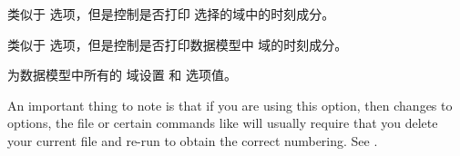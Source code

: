 \begin{optionlist}

类似于  选项，但是控制是否打印  选择的域中的时刻成分。


类似于  选项，但是控制是否打印数据模型中  域的时刻成分。


为数据模型中所有的  域设置  和  选项值。



 An important thing to note is that if you are using this option, then changes to options, the  file or certain commands like  will usually require that you delete your current  file and re-run \latex to obtain the correct numbering. See .


\end{optionlist}
